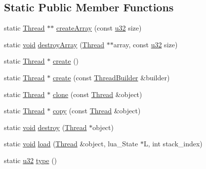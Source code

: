 \subsection*{Static Public Member Functions}
\begin{DoxyCompactItemize}
\item 
static \mbox{\hyperlink{classnjli_1_1_thread}{Thread}} $\ast$$\ast$ \mbox{\hyperlink{classnjli_1_1_thread_a30ca432834fe539f3560b9964f789a0f}{create\+Array}} (const \mbox{\hyperlink{_util_8h_a10e94b422ef0c20dcdec20d31a1f5049}{u32}} size)
\item 
static \mbox{\hyperlink{_thread_8h_af1e856da2e658414cb2456cb6f7ebc66}{void}} \mbox{\hyperlink{classnjli_1_1_thread_abfca36fb1618366c5c196a2c7076c245}{destroy\+Array}} (\mbox{\hyperlink{classnjli_1_1_thread}{Thread}} $\ast$$\ast$array, const \mbox{\hyperlink{_util_8h_a10e94b422ef0c20dcdec20d31a1f5049}{u32}} size)
\item 
static \mbox{\hyperlink{classnjli_1_1_thread}{Thread}} $\ast$ \mbox{\hyperlink{classnjli_1_1_thread_a1d5d960366afef7d49c9798d2ee7e6f0}{create}} ()
\item 
static \mbox{\hyperlink{classnjli_1_1_thread}{Thread}} $\ast$ \mbox{\hyperlink{classnjli_1_1_thread_afc6765a4e6e64e05e28013bdbc2dd38c}{create}} (const \mbox{\hyperlink{classnjli_1_1_thread_builder}{Thread\+Builder}} \&builder)
\item 
static \mbox{\hyperlink{classnjli_1_1_thread}{Thread}} $\ast$ \mbox{\hyperlink{classnjli_1_1_thread_a704923b90ea123659acaa4545b76c8b3}{clone}} (const \mbox{\hyperlink{classnjli_1_1_thread}{Thread}} \&object)
\item 
static \mbox{\hyperlink{classnjli_1_1_thread}{Thread}} $\ast$ \mbox{\hyperlink{classnjli_1_1_thread_ae4597841975827e25aaeea32f4e465fa}{copy}} (const \mbox{\hyperlink{classnjli_1_1_thread}{Thread}} \&object)
\item 
static \mbox{\hyperlink{_thread_8h_af1e856da2e658414cb2456cb6f7ebc66}{void}} \mbox{\hyperlink{classnjli_1_1_thread_a9fa49919c924343758d9148294ad8e6e}{destroy}} (\mbox{\hyperlink{classnjli_1_1_thread}{Thread}} $\ast$object)
\item 
static \mbox{\hyperlink{_thread_8h_af1e856da2e658414cb2456cb6f7ebc66}{void}} \mbox{\hyperlink{classnjli_1_1_thread_abf32abdd7ee4778ae166033b2295e444}{load}} (\mbox{\hyperlink{classnjli_1_1_thread}{Thread}} \&object, lua\+\_\+\+State $\ast$L, int stack\+\_\+index)
\item 
static \mbox{\hyperlink{_util_8h_a10e94b422ef0c20dcdec20d31a1f5049}{u32}} \mbox{\hyperlink{classnjli_1_1_thread_ae805bd8ca1582bfe6da7c73516c76d6d}{type}} ()
\end{DoxyCompactItemize}
